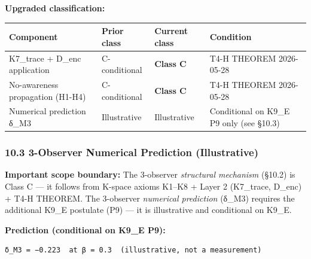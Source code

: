 \documentclass[
  11pt,
]{article}
\newcounter{none} %
\begin{document}
\textbf{Upgraded classification:}

{\def\LTcaptype{none} %
\begin{longtable}[]{@{}
  >{\raggedright\arraybackslash}p{}
  >{\raggedright\arraybackslash}p{}
  >{\raggedright\arraybackslash}p{}
  >{\raggedright\arraybackslash}p{}@{}}
\toprule\noalign{}
\begin{minipage}[b]{\linewidth}\raggedright
Component
\end{minipage} & \begin{minipage}[b]{\linewidth}\raggedright
Prior class
\end{minipage} & \begin{minipage}[b]{\linewidth}\raggedright
Current class
\end{minipage} & \begin{minipage}[b]{\linewidth}\raggedright
Condition
\end{minipage} \\
\midrule\noalign{}
\endhead
\bottomrule\noalign{}
\endlastfoot
K7\_trace + D\_enc application & C-conditional & \textbf{Class C} & T4-H
THEOREM 2026-05-28 \\
No-awareness propagation (H1-H4) & C-conditional & \textbf{Class C} &
T4-H THEOREM 2026-05-28 \\
Numerical prediction δ\_M3 & Illustrative & Illustrative & Conditional
on K9\_E P9 only (see §10.3) \\
\end{longtable}
}

\subsubsection{10.3 3-Observer Numerical Prediction
(Illustrative)}\label{observer-numerical-prediction-illustrative}

\textbf{Important scope boundary:} The 3-observer \emph{structural
mechanism} (§10.2) is Class C --- it follows from K-space axioms K1--K8
+ Layer 2 (K7\_trace, D\_enc) + T4-H THEOREM. The 3-observer
\emph{numerical prediction} (δ\_M3) requires the additional K9\_E
postulate (P9) --- it is illustrative and conditional on K9\_E.

\textbf{Prediction (conditional on K9\_E P9):}

\begin{verbatim}
δ_M3 = −0.223  at β = 0.3  (illustrative, not a measurement)
\end{verbatim}
\end{document}
